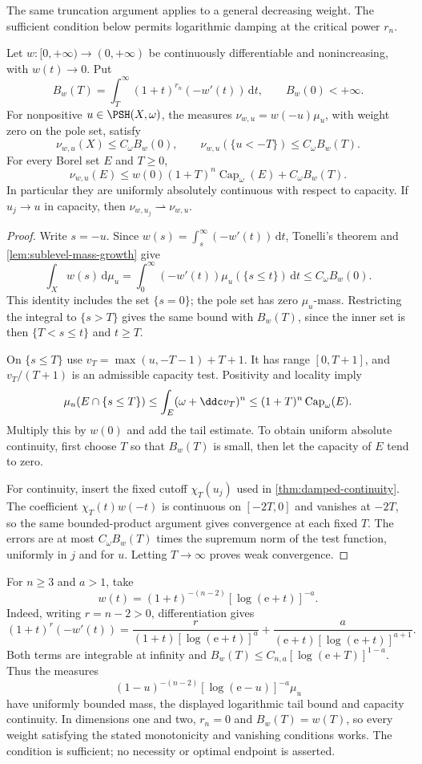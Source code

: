 The same truncation argument applies to a general decreasing weight. The sufficient condition below permits logarithmic damping at the critical power $r_n$.

\begin{proposition}\label{prop:general-damping-weights}
Let $w:[0,+\infty)\to(0,+\infty)$ be continuously differentiable and nonincreasing, with $w(t)\to0$. Put
\[
 B_w(T)=\int_T^\infty(1+t)^{r_n}(-w'(t))\,\mathrm{d}t,
 \qquad B_w(0)<+\infty.
\]
For nonpositive $u\in\PSH(X,\omega)$, the measures
$\nu_{w,u}=w(-u)\mu_u$, with weight zero on the pole set, satisfy
\[
 \nu_{w,u}(X)\leq C_\omega B_w(0),\qquad
 \nu_{w,u}(\{u<-T\})\leq C_\omega B_w(T).
\]
For every Borel set $E$ and $T\geq0$,
\[
 \nu_{w,u}(E)\leq
 w(0)(1+T)^n\operatorname{Cap}_\omega(E)+C_\omega B_w(T).
\]
In particular they are uniformly absolutely continuous with respect to capacity. If $u_j\to u$ in capacity, then $\nu_{w,u_j}\rightharpoonup\nu_{w,u}$.
\end{proposition}
\begin{proof}
Write $s=-u$. Since $w(s)=\int_s^\infty(-w'(t))\,\mathrm{d}t$, Tonelli's theorem and \cref{lem:sublevel-mass-growth} give
\[
 \int_X w(s)\,\mathrm{d}\mu_u
 =\int_0^\infty(-w'(t))\mu_u(\{s\leq t\})\,\mathrm{d}t
 \leq C_\omega B_w(0).
\]
This identity includes the set $\{s=0\}$; the pole set has zero $\mu_u$-mass. Restricting the integral to $\{s>T\}$ gives the same bound with $B_w(T)$, since the inner set is then $\{T<s\leq t\}$ and $t\geq T$.

On $\{s\leq T\}$ use $v_T=\max(u,-T-1)+T+1$. It has range $[0,T+1]$, and $v_T/(T+1)$ is an admissible capacity test. Positivity and locality imply
\[
 \mu_u(E\cap\{s\leq T\})
 \leq\int_E(\omega+\ddc v_T)^n
 \leq(1+T)^n\operatorname{Cap}_\omega(E).
\]
Multiply this by $w(0)$ and add the tail estimate. To obtain uniform absolute continuity, first choose $T$ so that $B_w(T)$ is small, then let the capacity of $E$ tend to zero.

For continuity, insert the fixed cutoff $\chi_T(u_j)$ used in \cref{thm:damped-continuity}. The coefficient $\chi_T(t)w(-t)$ is continuous on $[-2T,0]$ and vanishes at $-2T$, so the same bounded-product argument gives convergence at each fixed $T$. The errors are at most $C_\omega B_w(T)$ times the supremum norm of the test function, uniformly in $j$ and for $u$. Letting $T\to\infty$ proves weak convergence.
\end{proof}

For $n\geq3$ and $a>1$, take
\[
 w(t)=(1+t)^{-(n-2)}[\log(\mathrm{e}+t)]^{-a}.
\]
Indeed, writing $r=n-2>0$, differentiation gives
\[
 (1+t)^r(-w'(t))
 =\frac{r}{(1+t)[\log(\mathrm{e}+t)]^a}
  +\frac{a}{(\mathrm{e}+t)[\log(\mathrm{e}+t)]^{a+1}}.
\]
Both terms are integrable at infinity and
$B_w(T)\leq C_{n,a}[\log(\mathrm{e}+T)]^{1-a}$. Thus the measures
\[
 (1-u)^{-(n-2)}[\log(\mathrm{e}-u)]^{-a}\mu_u
\]
have uniformly bounded mass, the displayed logarithmic tail bound and capacity continuity. In dimensions one and two, $r_n=0$ and $B_w(T)=w(T)$, so every weight satisfying the stated monotonicity and vanishing conditions works. The condition is sufficient; no necessity or optimal endpoint is asserted.
